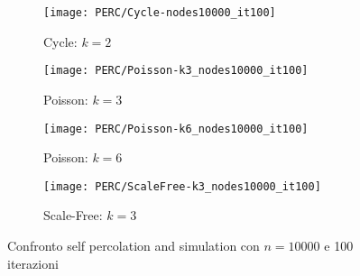     \begin{figure}[H]
        \begin{minipage}{\linewidth}
            \centering
            \begin{minipage}{0.45\linewidth}
                \begin{figure}
                    \texttt{[image: PERC/Cycle-nodes10000\_it100]}\caption{Cycle: $k=2$}
                    \label{fig:perc_cycle}
                \end{figure}
            \end{minipage}
            \hspace{0.05\linewidth}
            \begin{minipage}{0.45\linewidth}
                \begin{figure}
                    \texttt{[image: PERC/Poisson-k3\_nodes10000\_it100]}\caption{Poisson: $k=3$}
                    \label{fig:perc_poisson_k_3}
                \end{figure}
            \end{minipage}
            \begin{minipage}{0.45\linewidth}
                \begin{figure}
                    \texttt{[image: PERC/Poisson-k6\_nodes10000\_it100]}\caption{Poisson: $k=6$}
                    \label{fig:perc_poisson_k_6}
                \end{figure}
            \end{minipage}
            \hspace{0.05\linewidth}
            \begin{minipage}{0.45\linewidth}
                \begin{figure}
                    \texttt{[image: PERC/ScaleFree-k3\_nodes10000\_it100]}\caption{Scale-Free: $k=3$}
                    \label{fig:perc_scale_free_k_3}
                \end{figure}
            \end{minipage}
            \caption{Confronto self percolation and simulation con $n=10000$ e 100 iterazioni}
        \end{minipage}
    \end{figure}

